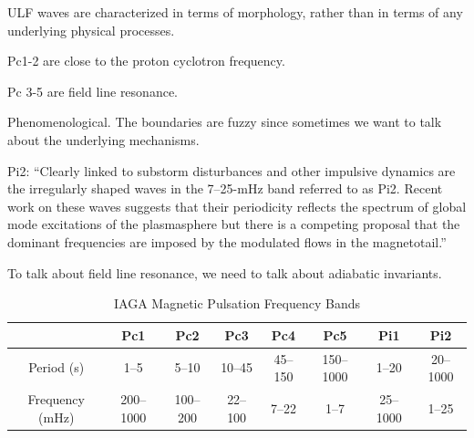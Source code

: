 
ULF waves are characterized in terms of morphology, rather than in terms of any underlying physical processes. 



Pc1-2 are close to the proton cyclotron frequency. 

Pc 3-5 are field line resonance. 

Phenomenological. The boundaries are fuzzy since sometimes we want to talk about the underlying mechanisms. 

Pi2: ``Clearly linked to substorm disturbances and other impulsive dynamics are the irregularly shaped waves in the 7--25-mHz band referred to as Pi2. Recent work on these waves suggests that their periodicity reflects the spectrum of global mode excitations of the plasmasphere but there is a competing proposal that the dominant frequencies are imposed by the modulated flows in the magnetotail.''\cite{kivelson_2006}

To talk about field line resonance, we need to talk about adiabatic invariants. 


\begin{longtable}{ @{\extracolsep{\fill}} cccccccc @{\extracolsep{\fill}} }
  \caption[IAGA Magnetic Pulsation Frequency Bands]{IAGA Magnetic Pulsation Frequency Bands\cite{jacobs_1964}}
  \label{tab_iaga} \\

  \toprule
  &
  Pc1 &
  Pc2 &
  Pc3 &
  Pc4 &
  Pc5 &
  Pi1 &
  Pi2 \\
  \midrule
  \endfirsthead

  \bottomrule
  \endlastfoot

  Period (\si{\second}) &
  1--5 &
  5--10 &
  10--45 &
  45--150 &
  150--1000 &
  1--20 &
  20--1000 \\

  Frequency (\si{\mHz})&
  200--1000 &
  100--200 &
  22--100 &
  7--22 &
  1--7 &
  25--1000 &
  1--25 \\

\end{longtable}

